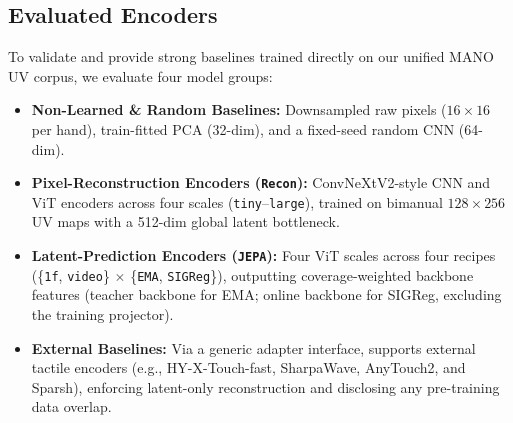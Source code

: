 \subsection{Evaluated Encoders}
\label{sec:encoders}
To validate \bench{} and provide strong baselines trained directly on our unified MANO UV corpus, we evaluate four model groups:
\begin{itemize}[leftmargin=*,nosep]
    \item \textbf{Non-Learned \& Random Baselines:} Downsampled raw pixels ($16\times 16$ per hand), train-fitted PCA (32-dim), and a fixed-seed random CNN (64-dim).
    \item \textbf{Pixel-Reconstruction Encoders (\texttt{Recon}):} ConvNeXtV2-style CNN \citep{woo2023convnext} and ViT \citep{dosovitskiy2021image} encoders across four scales (\texttt{tiny}--\texttt{large}), trained on bimanual $128\times 256$ UV maps with a 512-dim global latent bottleneck.
    \item \textbf{Latent-Prediction Encoders (\texttt{JEPA}):} Four ViT scales across four recipes (\{\texttt{1f}, \texttt{video}\} $\times$ \{\texttt{EMA}, \texttt{SIGReg}\}), outputting coverage-weighted backbone features (teacher backbone for EMA; online backbone for SIGReg, excluding the training projector).
    \item \textbf{External Baselines:} Via a generic adapter interface, \bench{} supports external tactile encoders (e.g., HY-X-Touch-fast, SharpaWave, AnyTouch2, and Sparsh), enforcing latent-only reconstruction and disclosing any pre-training data overlap.
\end{itemize}
